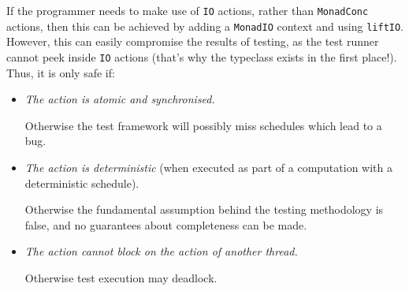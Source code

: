 If the programmer needs to make use of \verb|IO| actions, rather than
\verb|MonadConc| actions, then this can be achieved by adding a
\verb|MonadIO| context and using \verb|liftIO|. However, this can
easily compromise the results of testing, as the test runner cannot
peek inside \verb|IO| actions (that's why the typeclass exists in the
first place!). Thus, it is only safe if:

\begin{itemize}
\item \emph{The action is atomic and synchronised.}

  Otherwise the test framework will possibly miss schedules which lead
  to a bug.
\item \emph{The action is deterministic} (when executed as part of a
  computation with a deterministic schedule).

  Otherwise the fundamental assumption behind the testing methodology
  is false, and no guarantees about completeness can be made.
\item \emph{The action cannot block on the action of another thread.}

  Otherwise test execution may deadlock.
\end{itemize}
